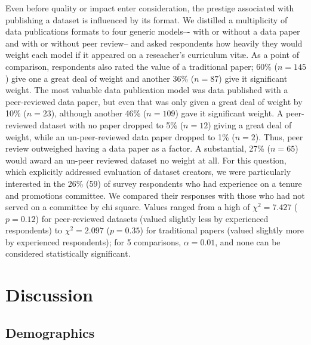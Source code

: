 \documentclass[10pt]{article}
\begin{document}
Even before quality or impact enter consideration, the prestige associated with publishing a dataset is influenced by its format.
We distilled a multiplicity of data publications formats to four generic models–- with or without a data paper and with or without peer review-- and asked respondents how heavily they would weight each model if it appeared on a reseacher's curriculum vit{\ae}.
As a point of comparison, respondents also rated the value of a traditional paper; 60\% ($n=145$) give one a great deal of weight and another 36\% ($n=87$) give it significant weight.
The most valuable data publication model was data published with a peer-reviewed data paper, but even that was only given a great deal of weight by 10\% ($n=23$), although another 46\% ($n=109$) gave it significant weight.
A peer-reviewed dataset with no paper dropped to 5\% ($n=12$) giving a great deal of weight, while an un-peer-reviewed data paper dropped to 1\% ($n=2$).
Thus, peer review outweighed having a data paper as a factor. 
A substantial, 27\% ($n=65$) would award an un-peer reviewed dataset no weight at all.
For this question, which explicitly addressed evaluation of dataset creators, we were particularly interested in the 26\% (59) of survey respondents who had experience on a tenure and promotions committee.
We compared their responses with those who had not served on a committee by chi square.
Values ranged from a high of $\chi^{2}= 7.427$ ($p= 0.12$) for peer-reviewed datasets (valued slightly less by experienced respondents) to $\chi^{2}= 2.097$ ($p= 0.35$) for traditional papers (valued slightly more by experienced respondents); for 5 comparisons, $\alpha=0.01$, and none can be considered statistically significant.

\section*{Discussion}

\subsection*{Demographics}
\end{document}
